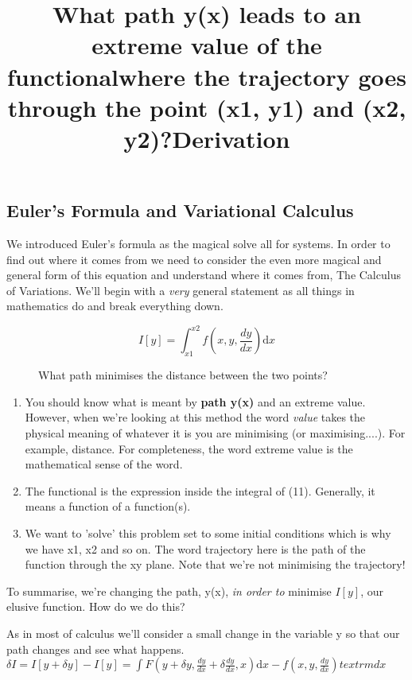 \subsection{Euler's Formula and Variational Calculus}
We introduced Euler's formula as the magical solve all for systems. In order to find out where it comes from we need to consider the even more magical and general form of this equation and understand where it comes from, The Calculus of Variations. We'll begin with a \textit{very} general statement as all things in mathematics do and break everything down.
\title{What path y(x) leads to an extreme value of the functional}
\begin{equation}
I[y] = \int_{x1}^{x2} \! f(x, y, \frac{dy}{dx}) \textrm{d}x
\end{equation}
\title{where the trajectory goes through the point (x1, y1) and (x2, y2)?}
\begin{figure}[h!]
\caption{What path minimises the distance between the two points?}
\end{figure}
\begin{enumerate}
\item You should know what is meant by \textbf{path y(x)} and an extreme value. However, when we're looking at this method the word \textit{value} takes the physical meaning of whatever it is you are minimising (or maximising....). For example, distance. For completeness, the word extreme value is the mathematical sense of the word.
\item The functional is the expression inside the integral of (11). Generally, it means a function of a function(s). 
\item We want to 'solve' this problem set to some initial conditions which is why we have x1, x2 and so on. The word trajectory here is the path of the function through the xy plane. Note that we're not minimising the trajectory!
\end{enumerate}
To summarise, we're changing the path, y(x), \textit{in order to} minimise $I[y]$, our elusive function. How do we do this?
\par
\title{\large{\textbf{Derivation}}}
As in most of calculus we'll consider a small change in the variable y so that our path changes and see what happens.
\begin{math}
\delta I = I[y +\delta y] - I[y] = \int \! F(y + \delta y, \frac{dy}{dx} + \delta \frac{dy}{dx}, x) \textrm{d}x -  f(x, y, \frac{dy}{dx}) textrm{d}x
\end{math}




